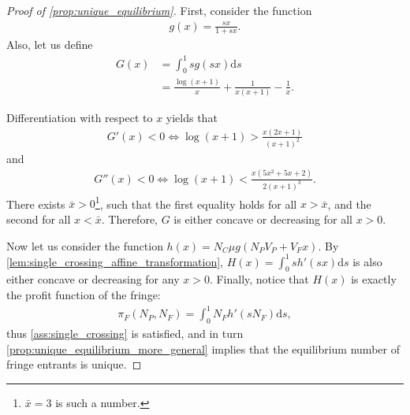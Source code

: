 \documentclass[a4paper]{article}
\newcommand{\ds}{\mathrm{d}s}
\begin{document}
\begin{proof}[Proof of \cref{prop:unique_equilibrium}]
    First, consider the function
    \begin{align*}
        g(x) = \frac{sx}{1 + sx}.
    \end{align*}
    Also, let us define
    \begin{align*}
        G(x) &= \int_0^1 s g(sx) \ds \\
        &= \frac{\log(x+1)}{x} + \frac{1}{x(x+1)} - \frac{1}{x}.
    \end{align*}

    Differentiation with respect to $x$ yields that
    \begin{align*}
        G'(x) < 0 \iff \log(x+1) > \frac{x (2x+1)}{(x+1)^2}
    \end{align*}
    and
    \begin{align*}
        G''(x) < 0 \iff \log(x+1) < \frac{x (5x^2 + 5x + 2)}{2 (x+1)^3}.
    \end{align*}
    There exists $\bar{x} > 0$\footnote{
        $\bar{x} = 3$ is such a number.
    }, such that the first equality holds for all $x > \bar{x}$, and the second for all $x < \bar{x}$.
    Therefore, $G$ is either concave or decreasing for all $x > 0$.

    Now let us consider the function $h(x) = N_C \mu g(N_P V_P + V_F x)$.
    By \cref{lem:single_crossing_affine_transformation}, $H(x) = \int_0^1 s h'(sx) \ds$ is also either concave or decreasing for any $x > 0$.
    Finally, notice that $H(x)$ is exactly the profit function of the fringe:
    \begin{align*}
        \pi_F(N_P, N_F) = \int_0^1 N_F h'(s N_F) \ds,
    \end{align*}
    thus \cref{ass:single_crossing} is satisfied, and in turn \cref{prop:unique_equilibrium_more_general} implies that the equilibrium number of fringe entrants is unique.
\end{proof}
\end{document}
